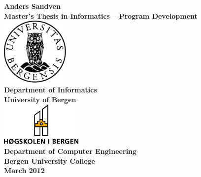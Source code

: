 \begin{titlepage}
\begin{center}

\hspace*{\fill} \\[1.5cm]


\bfseries{\LARGE{\thesistitle{}}}\\[1cm]

\normalsize Anders Sandven \\[0.5cm]

{\normalsize Master's Thesis in Informatics -- Program Development}\\[5cm]

\includegraphics[width=0.25\textwidth]{images/uib_logo.pdf}\\
{\normalsize Department of Informatics}\\
{\normalsize University of Bergen}\\[1cm]

\includegraphics[width=0.3\textwidth]{images/hib_logo.pdf}\\
{\normalsize Department of Computer Engineering}\\
{\normalsize Bergen University College}\\[1cm]

\normalsize March 2012
% 

\end{center}
\end{titlepage} 